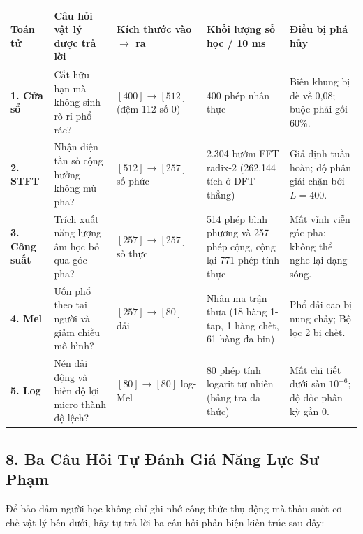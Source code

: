 \documentclass[11pt,a4paper]{article}
\begin{document}
\begin{table}[h]
\centering
\small
\setlength{\tabcolsep}{3pt}
\begin{tabular}{lp{3.4cm}p{3.2cm}p{3.8cm}p{3.0cm}}
\toprule
\textbf{Toán tử} & \textbf{Câu hỏi vật lý được trả lời} & \textbf{Kích thước vào $\to$ ra} & \textbf{Khối lượng số học / 10 ms} & \textbf{Điều bị phá hủy} \\
\midrule
\textbf{1. Cửa sổ} & Cắt hữu hạn mà không sinh rò rỉ phổ rác? & $[400] \to [512]$ (đệm 112 số 0) & 400 phép nhân thực & Biên khung bị đè về 0,08; buộc phải gối 60\%. \\
\addlinespace
\textbf{2. STFT} & Nhận diện tần số cộng hưởng không mù pha? & $[512] \to [257]$ số phức & 2.304 bướm FFT radix-2 (262.144 tích ở DFT thẳng) & Giả định tuần hoàn; độ phân giải chặn bởi $L = 400$. \\
\addlinespace
\textbf{3. Công suất} & Trích xuất năng lượng âm học bỏ qua góc pha? & $[257] \to [257]$ số thực & 514 phép bình phương và 257 phép cộng, cộng lại 771 phép tính thực & Mất vĩnh viễn góc pha; không thể nghe lại dạng sóng. \\
\addlinespace
\textbf{4. Mel} & Uốn phổ theo tai người và giảm chiều mô hình? & $[257] \to [80]$ dải & Nhân ma trận thưa (18 hàng 1-tap, 1 hàng chết, 61 hàng đa bin) & Phổ dải cao bị nung chảy; Bộ lọc 2 bị chết. \\
\addlinespace
\textbf{5. Log} & Nén dải động và biến độ lợi micro thành độ lệch? & $[80] \to [80]$ log-Mel & 80 phép tính logarit tự nhiên (bảng tra đa thức) & Mất chi tiết dưới sàn $10^{-6}$; độ dốc phân kỳ gần 0. \\
\bottomrule
\end{tabular}
\end{table}

\clearpage


\subsection*{8. Ba Câu Hỏi Tự Đánh Giá Năng Lực Sư Phạm}

Để bảo đảm người học không chỉ ghi nhớ công thức thụ động mà thấu suốt cơ chế vật lý bên dưới, hãy tự trả lời ba câu hỏi phản biện kiến trúc sau đây:
\end{document}

